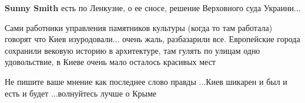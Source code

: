 \begin{itemize}
\begin{itemize} %
\textbf{Sunny Smith} есть по Ленкузне, о ее сносе, решение Верховного суда Украини...
\end{itemize} %


Сами работники управления памятников культуры (когда то там работала) говорят
что Киев изуродовали... очень жаль, разбазарили все. Европейские города
сохранили вековую историю в архитектуре, там гулять по улицам одно
удовольствие, в Киеве очень мало осталось красивых мест


Не пишите ваше мнение как последнее слово правды ...Киев шикарен и был и есть и
будет ...волнуйтесь лучше о Крыме

\end{itemize} %
